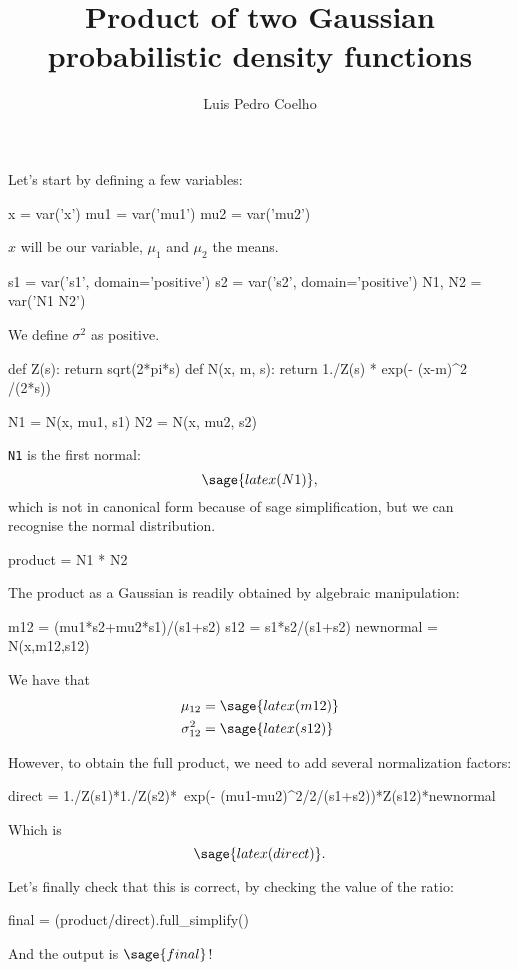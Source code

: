 \documentclass{article}
\begin{document}
\title{Product of two Gaussian probabilistic density functions}
\author{Luis Pedro Coelho}
\maketitle

Let's start by defining a few variables:
\begin{sageblock}
x = var('x')
mu1 = var('mu1')
mu2 = var('mu2')
\end{sageblock}
$x$ will be our variable, $\mu_1$ and $\mu_2$ the means.

\begin{sageblock}
s1 = var('s1', domain='positive')
s2 = var('s2', domain='positive')
N1, N2 = var('N1 N2')
\end{sageblock}
We define $\sigma^2$ as positive.

\begin{sageblock}
def Z(s):
    return sqrt(2*pi*s)
def N(x, m, s):
    return 1./Z(s) * exp(- (x-m)^2 /(2*s))

N1 = N(x, mu1, s1)
N2 = N(x, mu2, s2)
\end{sageblock}

\texttt{N1} is the first normal:
\begin{equation}
\sage{latex(N1)},
\end{equation}
which is not in canonical form because of sage simplification, but we can
recognise the normal distribution.

\begin{sageblock}
product = N1 * N2
\end{sageblock}


The product as a Gaussian is readily obtained by algebraic manipulation:
\begin{sageblock}
m12 = (mu1*s2+mu2*s1)/(s1+s2)
s12 = s1*s2/(s1+s2)
newnormal = N(x,m12,s12)
\end{sageblock}

We have that
\begin{align}
\mu_{12} &= \sage{latex(m12)} \\
\sigma_{12}^2 &= \sage{latex(s12)}
\end{align}

However, to obtain the full product, we need to add several normalization factors:
\begin{sageblock}
direct = 1./Z(s1)*1./Z(s2)*\
        exp(- (mu1-mu2)^2/2/(s1+s2))*Z(s12)*newnormal
\end{sageblock}
Which is
\begin{equation}
\sage{latex(direct)}.
\end{equation}

Let's finally check that this is correct, by checking the value of the ratio:
\begin{sageblock}
final = (product/direct).full_simplify()
\end{sageblock}

And the output is $\sage{final}$!
\end{document}
